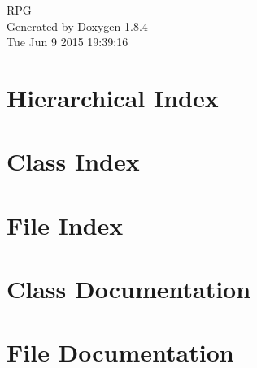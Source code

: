 \documentclass[twoside]{book}
\newcommand{\clearemptydoublepage}{%
  \newpage{\pagestyle{empty}\cleardoublepage}%
}
\begin{document}
\hypersetup{pageanchor=false}
\begin{titlepage}
\vspace*{7cm}
\begin{center}%
{\Large R\-P\-G }\\
\vspace*{1cm}
{\large Generated by Doxygen 1.8.4}\\
\vspace*{0.5cm}
{\small Tue Jun 9 2015 19:39:16}\\
\end{center}
\end{titlepage}
\clearemptydoublepage
\tableofcontents
\clearemptydoublepage
{}
\hypersetup{pageanchor=true}

\chapter{Hierarchical Index}

\chapter{Class Index}

\chapter{File Index}

\chapter{Class Documentation}


















\chapter{File Documentation}



































\newpage
{}
{}
\printindex
\end{document}
